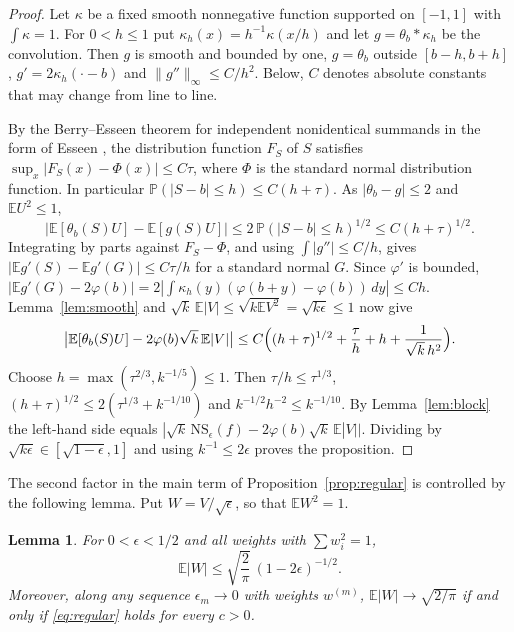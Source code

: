 \documentclass[11pt]{amsart}
\newtheorem{lemma}[theorem]{Lemma}
\theoremstyle{remark}
\numberwithin{equation}{section}
\newcommand{\PP}{\mathbb{P}}
\newcommand{\EE}{\mathbb{E}}
\begin{document}
\begin{proof}
Let $\kappa$ be a fixed smooth nonnegative function supported on $[-1,1]$ with $\int\kappa=1$. For $0<h\le1$ put $\kappa_h(x)=h^{-1}\kappa(x/h)$ and let $g=\theta_b*\kappa_h$ be the convolution. Then $g$ is smooth and bounded by one, $g=\theta_b$ outside $[b-h,b+h]$, $g'=2\kappa_h(\cdot-b)$ and $\|g''\|_\infty\le C/h^2$. Below, $C$ denotes absolute constants that may change from line to line.

By the Berry--Esseen theorem for independent nonidentical summands in the form of Esseen \cite{Ber41,Ess42}, the distribution function $F_S$ of $S$ satisfies $\sup_x|F_S(x)-\Phi(x)|\le C\tau$, where $\Phi$ is the standard normal distribution function. In particular $\PP(|S-b|\le h)\le C(h+\tau)$. As $|\theta_b-g|\le2$ and $\EE U^2\le1$,
\[
|\EE[\theta_b(S)U]-\EE[g(S)U]|\le2\,\PP(|S-b|\le h)^{1/2}\le C(h+\tau)^{1/2}.
\]
Integrating by parts against $F_S-\Phi$, and using $\int|g''|\le C/h$, gives $|\EE g'(S)-\EE g'(G)|\le C\tau/h$ for a standard normal $G$. Since $\varphi'$ is bounded, $|\EE g'(G)-2\varphi(b)|=2|\int\kappa_h(y)(\varphi(b+y)-\varphi(b))\,dy|\le Ch$. Lemma~\ref{lem:smooth} and $\sqrt k\,\EE|V|\le\sqrt{k\EE V^2}=\sqrt{k\epsilon}\le1$ now give
\[
\bigl|\EE[\theta_b(S)U]-2\varphi(b)\sqrt k\,\EE|V|\bigr|\le C\Bigl((h+\tau)^{1/2}+\frac\tau h+h+\frac{1}{\sqrt k\,h^2}\Bigr).
\]
Choose $h=\max(\tau^{2/3},k^{-1/5})\le1$. Then $\tau/h\le\tau^{1/3}$, $(h+\tau)^{1/2}\le 2(\tau^{1/3}+k^{-1/10})$ and $k^{-1/2}h^{-2}\le k^{-1/10}$. By Lemma~\ref{lem:block} the left-hand side equals $|\sqrt k\,\mathrm{NS}_\epsilon(f)-2\varphi(b)\sqrt k\,\EE|V||$. Dividing by $\sqrt{k\epsilon}\in[\sqrt{1-\epsilon},1]$ and using $k^{-1}\le2\epsilon$ proves the proposition.
\end{proof}


The second factor in the main term of Proposition~\ref{prop:regular} is controlled by the following lemma. Put $W=V/\sqrt\epsilon$, so that $\EE W^2=1$.

\begin{lemma}\label{lem:thin}
For $0<\epsilon<1/2$ and all weights with $\sum w_i^2=1$,
\[
\EE|W|\le\sqrt{\frac2\pi}\,(1-2\epsilon)^{-1/2}.
\]
Moreover, along any sequence $\epsilon_m\to0$ with weights $w^{(m)}$, $\EE|W|\to\sqrt{2/\pi}$ if and only if \eqref{eq:regular} holds for every $c>0$.
\end{lemma}
\end{document}
